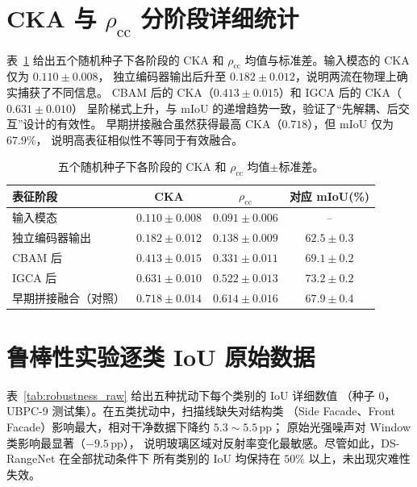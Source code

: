 \section{CKA 与 $\rho_{\mathrm{cc}}$ 分阶段详细统计}
\label{app:cka_detail}

表~\ref{tab:cka_full} 给出五个随机种子下各阶段的 CKA 和 $\rho_{\mathrm{cc}}$
均值与标准差。输入模态的 CKA 仅为 $0.110\pm0.008$，
独立编码器输出后升至 $0.182\pm0.012$，说明两流在物理上确实捕获了不同信息。
CBAM 后的 CKA（$0.413\pm0.015$）和 IGCA 后的 CKA（$0.631\pm0.010$）
呈阶梯式上升，与 mIoU 的递增趋势一致，验证了``先解耦、后交互''设计的有效性。
早期拼接融合虽然获得最高 CKA（$0.718$），但 mIoU 仅为 $67.9\%$，
说明高表征相似性不等同于有效融合。

\begin{table}[htbp]
  \centering
  \caption[各阶段 CKA 与 $\rho_{\mathrm{cc}}$ 完整统计]{五个随机种子下各阶段的 CKA 和 $\rho_{\mathrm{cc}}$ 均值$\pm$标准差。}
  \label{tab:cka_full}
  \small
  \begin{tabular}{lccc}
    \toprule
    表征阶段 & CKA & $\rho_{\mathrm{cc}}$ & 对应 mIoU(\%) \\
    \midrule
    输入模态 & $0.110\pm0.008$ & $0.091\pm0.006$ & -- \\
    独立编码器输出 & $0.182\pm0.012$ & $0.138\pm0.009$ & $62.5\pm0.3$ \\
    CBAM 后 & $0.413\pm0.015$ & $0.331\pm0.011$ & $69.1\pm0.2$ \\
    IGCA 后 & $0.631\pm0.010$ & $0.522\pm0.013$ & $73.2\pm0.2$ \\
    早期拼接融合（对照） & $0.718\pm0.014$ & $0.614\pm0.016$ & $67.9\pm0.4$ \\
    \bottomrule
  \end{tabular}
\end{table}

\section{鲁棒性实验逐类 IoU 原始数据}
\label{app:robustness_detail}

表~\ref{tab:robustness_raw} 给出五种扰动下每个类别的 IoU 详细数值
（种子 0，UBPC-9 测试集）。在五类扰动中，扫描线缺失对结构类
（Side Facade、Front Facade）影响最大，相对干净数据下降约 $5.3\sim5.5$\,pp；
原始光强噪声对 Window 类影响最显著（$-9.5$\,pp），
说明玻璃区域对反射率变化最敏感。尽管如此，DS-RangeNet 在全部扰动条件下
所有类别的 IoU 均保持在 $50\%$ 以上，未出现灾难性失效。

